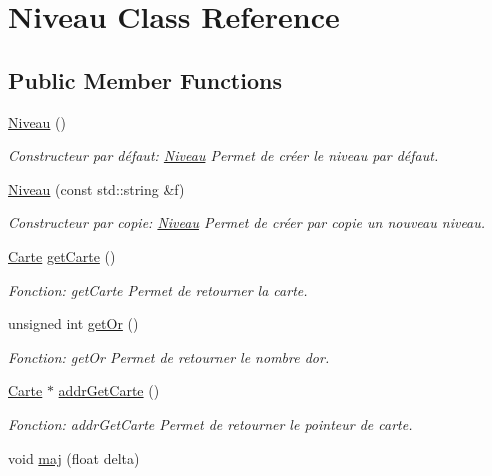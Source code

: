 \hypertarget{classNiveau}{}\section{Niveau Class Reference}
\label{classNiveau}
\subsection*{Public Member Functions}
\begin{DoxyCompactItemize}
\item 
\hyperlink{classNiveau_abf99be59a575d462a25c4ade5c124431}{Niveau} ()
\begin{DoxyCompactList}\small\item\em Constructeur par défaut\+: \hyperlink{classNiveau}{Niveau} Permet de créer le niveau par défaut. \end{DoxyCompactList}\item 
\hyperlink{classNiveau_a5f59a46da066f15b0c21154cbf583490}{Niveau} (const std\+::string \&f)
\begin{DoxyCompactList}\small\item\em Constructeur par copie\+: \hyperlink{classNiveau}{Niveau} Permet de créer par copie un nouveau niveau. \end{DoxyCompactList}\item 
\hyperlink{classCarte}{Carte} \hyperlink{classNiveau_a503e0b7db795e1f9bf3ea76cc4fd9e99}{get\+Carte} ()
\begin{DoxyCompactList}\small\item\em Fonction\+: get\+Carte Permet de retourner la carte. \end{DoxyCompactList}\item 
unsigned int \hyperlink{classNiveau_a86202965dadd70b9f13c4e5e78a46542}{get\+Or} ()
\begin{DoxyCompactList}\small\item\em Fonction\+: get\+Or Permet de retourner le nombre d\textquotesingle{}or. \end{DoxyCompactList}\item 
\hyperlink{classCarte}{Carte} $\ast$ \hyperlink{classNiveau_a47ea8b8f36e27be8ad0d3f534a956260}{addr\+Get\+Carte} ()
\begin{DoxyCompactList}\small\item\em Fonction\+: addr\+Get\+Carte Permet de retourner le pointeur de carte. \end{DoxyCompactList}\item 
void \hyperlink{classNiveau_a4434c142b17c0299d2d7744b2ea11e99}{maj} (float delta)

\end{DoxyCompactItemize}
